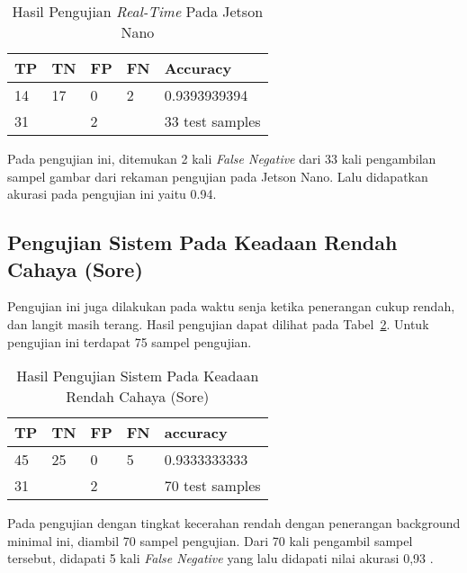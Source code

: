 \begin{table}
    \centering
    \caption{Hasil Pengujian \emph{Real-Time} Pada Jetson Nano}
    \label{tb:systest_jetson}
    \begin{tabular}{|l|l|l|l|l|} 
        \hline
        TP & TN                    & FP & FN                & Accuracy         \\ 
        \hline
        14 & 17                    & 0  & 2                 & 0.9393939394     \\ 
        \hline
        \multicolumn{2}{|l|}{31}   & \multicolumn{2}{l|}{2} & 33 test samples  \\
        \hline
    \end{tabular}
\end{table}

\par Pada pengujian ini, ditemukan 2 kali \emph{False Negative} dari 33 kali pengambilan sampel gambar dari rekaman pengujian pada Jetson Nano. Lalu didapatkan akurasi pada pengujian ini yaitu 0.94. 

\subsection{Pengujian Sistem Pada Keadaan Rendah Cahaya (Sore)}
\label{subsec:systest_test_lowilu_sore}

\par Pengujian ini juga dilakukan pada waktu senja ketika penerangan cukup rendah, dan langit masih terang. Hasil pengujian dapat dilihat pada Tabel~\ref{tb:systest_lowillum_dusk}. Untuk pengujian ini terdapat 75 sampel pengujian.

\begin{table}
    \centering
    \caption{Hasil Pengujian Sistem Pada Keadaan Rendah Cahaya (Sore)}
    \label{tb:systest_lowillum_dusk}
    \begin{tabular}{|l|l|l|l|l|} 
        \hline
        TP & TN                    & FP & FN                & accuracy         \\ 
        \hline
        45 & 25                    & 0  & 5                 & 0.9333333333    \\ 
        \hline
        \multicolumn{2}{|l|}{31}   & \multicolumn{2}{l|}{2} & 70 test samples  \\
        \hline
    \end{tabular}
\end{table}

\par Pada pengujian dengan tingkat kecerahan rendah dengan penerangan background minimal ini, diambil 70 sampel pengujian. Dari 70 kali pengambil sampel tersebut, didapati 5 kali \emph{False Negative} yang lalu didapati nilai akurasi 0,93 .


